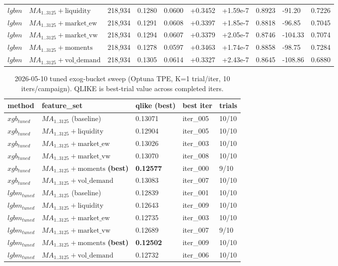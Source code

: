 \documentclass{article}
\begin{document}
\begin{table}[t]
\begin{tabular}{llllllllll}
$lgbm$ & $MA_{1..3125}+\mathrm{liquidity}$ & 218,934 & 0.1280 & 0.0600 & +0.3452 & +1.59e-7 & 0.8923 & -91.20 & 0.7226 \\
$lgbm$ & $MA_{1..3125}+\mathrm{market\_ew}$ & 218,934 & 0.1291 & 0.0608 & +0.3397 & +1.85e-7 & 0.8818 & -96.85 & 0.7045 \\
$lgbm$ & $MA_{1..3125}+\mathrm{market\_vw}$ & 218,934 & 0.1294 & 0.0607 & +0.3379 & +2.05e-7 & 0.8746 & -104.33 & 0.7074 \\
$lgbm$ & $MA_{1..3125}+\mathrm{moments}$ & 218,934 & 0.1278 & 0.0597 & +0.3463 & +1.74e-7 & 0.8858 & -98.75 & 0.7284 \\
$lgbm$ & $MA_{1..3125}+\mathrm{vol\_demand}$ & 218,934 & 0.1305 & 0.0614 & +0.3327 & +2.43e-7 & 0.8645 & -108.86 & 0.6880 \\
\bottomrule
\end{tabular}
\end{table}

\begin{table}[t]
\centering
\caption{2026-05-10 tuned exog-bucket sweep (Optuna TPE, K=1 trial/iter, 10 iters/campaign). QLIKE is best-trial value across completed iters.}
\label{tab:master_exog_sweep_tuned}
\begin{tabular}{lllll}
\toprule
method & feature\_set & qlike (best) & best iter & trials \\
\midrule
$xgb_{tuned}$ & $MA_{1..3125}$ (baseline) & 0.13071 & iter\_005 & 10/10 \\
$xgb_{tuned}$ & $MA_{1..3125}+\mathrm{liquidity}$ & 0.12904 & iter\_005 & 10/10 \\
$xgb_{tuned}$ & $MA_{1..3125}+\mathrm{market\_ew}$ & 0.13026 & iter\_003 & 10/10 \\
$xgb_{tuned}$ & $MA_{1..3125}+\mathrm{market\_vw}$ & 0.13070 & iter\_008 & 10/10 \\
$xgb_{tuned}$ & $MA_{1..3125}+\mathrm{moments}$ \textbf{(best)} & \textbf{0.12577} & iter\_000 & 9/10 \\
$xgb_{tuned}$ & $MA_{1..3125}+\mathrm{vol\_demand}$ & 0.13083 & iter\_007 & 10/10 \\
\midrule
$lgbm_{tuned}$ & $MA_{1..3125}$ (baseline) & 0.12839 & iter\_001 & 10/10 \\
$lgbm_{tuned}$ & $MA_{1..3125}+\mathrm{liquidity}$ & 0.12643 & iter\_009 & 10/10 \\
$lgbm_{tuned}$ & $MA_{1..3125}+\mathrm{market\_ew}$ & 0.12735 & iter\_003 & 10/10 \\
$lgbm_{tuned}$ & $MA_{1..3125}+\mathrm{market\_vw}$ & 0.12689 & iter\_007 & 9/10 \\
$lgbm_{tuned}$ & $MA_{1..3125}+\mathrm{moments}$ \textbf{(best)} & \textbf{0.12502} & iter\_009 & 10/10 \\
$lgbm_{tuned}$ & $MA_{1..3125}+\mathrm{vol\_demand}$ & 0.12732 & iter\_006 & 10/10 \\
\bottomrule
\end{tabular}
\end{table}
\end{document}
